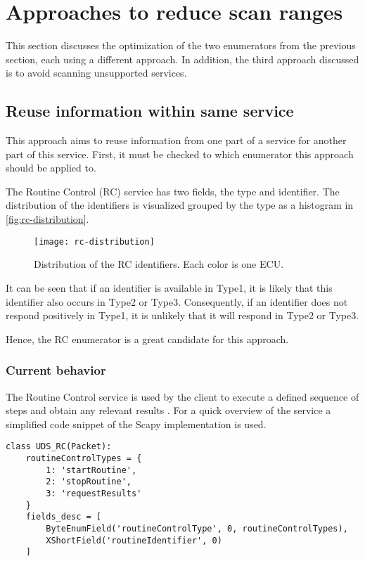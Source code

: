\section{Approaches to reduce scan ranges}

This section discusses the optimization of the two enumerators from the previous section, each using a different approach. In addition, the third approach discussed is to avoid scanning unsupported services. 

\subsection{Reuse information within same service}

This approach aims to reuse information from one part of a service for another part of this service. First, it must be checked to which enumerator this approach should be applied to.

The Routine Control (RC) service has two fields, the type and identifier. The distribution of the identifiers is visualized grouped by the type as a histogram in \autoref{fig:rc-distribution}.

\begin{figure}[h]
    \centering
    \texttt{[image: rc-distribution]}
    \caption{Distribution of the RC identifiers. Each color is one ECU.}
    \label{fig:rc-distribution}
\end{figure}

It can be seen that if an identifier is available in Type1, it is likely that this identifier also occurs in Type2 or Type3. Consequently, if an identifier does not respond positively in Type1, it is unlikely that it will respond in Type2 or Type3.

Hence, the RC enumerator is a great candidate for this approach.

\subsubsection{Current behavior}

The Routine Control service is used by the client to execute a defined sequence of steps and obtain any relevant results \cite{iso14229}. For a quick overview of the service a simplified code snippet of the Scapy implementation is used.

\begin{samepage}
\begin{verbatim}
class UDS_RC(Packet):
    routineControlTypes = {
        1: 'startRoutine',
        2: 'stopRoutine',
        3: 'requestResults'
    }
    fields_desc = [
        ByteEnumField('routineControlType', 0, routineControlTypes),
        XShortField('routineIdentifier', 0)
    ]
\end{verbatim}
\end{samepage}


